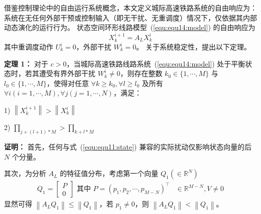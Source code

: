 借鉴控制理论中的自由运行系统概念，本文定义城际高速铁路系统的自由响应为：系统在无任何外部干预或控制输入（即无干扰、无重调度）情况下，仅依据其内部动态演化的运行行为。
状态空间环形线路模型~(\ref{equ:equ14:model}) 的自由响应为
\begin{equation}
    X_k^{i+1} = A_LX_k^i
    \label{equ:equ18}
\end{equation}
其中重调度动作 $U_k^i =0$，外部干扰 $W_k^i=0$。
关于系统稳定性，提出以下定理。

\textbf{定理 1：} 对于 $c >0$，当城际高速铁路线路系统~(\ref{equ:equ14:model}) 处于平衡状态时，若其遭受有界外部干扰 $W_k^i \neq 0$，则存在整数 $k_0 \in \{1,\cdots, M\}$ 与 $l_0 \in \{1,\cdots, M\}$，使得对任意 $\forall k \geq k_{0}, \forall l \geq l_{0}$ 及所有 $\forall i(i=1, \cdots, M), \forall j(j=1, \cdots, N)$，满足：

1) $\left\|X_{k}^{i+1}\right\|>\left\|X_{k}^{i}\right\|$

2) $\prod_{j+(l+1)\ast M}>\prod_{k+l\ast M}$

\textbf{证明：} 首先，任何与式~(\ref{equ:equ11:state}) 兼容的实际扰动仅影响状态向量的后 $N$ 个分量。

其次，为分析 $A_L$ 的特征值分布，考虑第一个向量 $Q_{1}\left(\in \mathbb{R}^{N}\right)$
\begin{equation*}
    \begin{aligned}
        Q_{1}=\left[\begin{array}{l}
            P \\
            0
        \end{array}\right] \text { 其中 } P=\left(p_{1}, p_{2}, \cdots, p_{M-N}\right)^{\top} & \in \mathbb{R}^{M-N}, V \neq 0
    \end{aligned}
\end{equation*}
显然可得 $\left\|A_{L} Q_{1}\right\| \leq\left\|Q_{1}\right\|$，若 $p_1 \neq 0$，则 $\left\|A_{L} Q_{1}\right\| <\left\|Q_{1}\right\|$。

